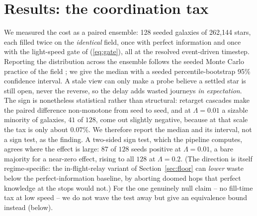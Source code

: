 \section{Results: the coordination tax}
\label{sec:results}

We measured the cost as a paired ensemble: 128 seeded galaxies of 262{,}144 stars, each filled twice on
the \emph{identical} field, once with perfect information and once with the light-speed gate of
(\ref{eq:gate}), all at the resolved event-driven timestep. Reporting the distribution across the
ensemble follows the seeded Monte Carlo practice of the field \citep{forgan-2009}; we give the
median with a seeded percentile-bootstrap 95\% confidence interval. A stale view can only make a
probe believe a settled star is still open, never the reverse, so the delay adds wasted journeys
\emph{in expectation}. The sign is nonetheless statistical rather than
structural: retarget cascades make the paired difference non-monotone from seed to seed, and at
$\Lambda = 0.01$ a sizable minority of galaxies, $41$ of $128$, come out slightly negative, because
at that scale the tax is only about $0.07\%$. We therefore report the median and its interval, not a
sign test, as the finding. A two-sided sign test, which the pipeline computes, agrees where the
effect is large: $87$ of $128$ seeds positive at $\Lambda = 0.01$, a bare majority for a near-zero
effect, rising to all $128$ at $\Lambda = 0.2$. (The direction is itself regime-specific:
the in-flight-relay variant of Section~\ref{sec:floor} can \emph{lower} waste
below the perfect-information baseline, by aborting doomed hops that perfect knowledge at the stops
would not.) For the one genuinely null claim -- no fill-time tax at low speed -- we do not wave the
test away but give an equivalence bound instead (below).

